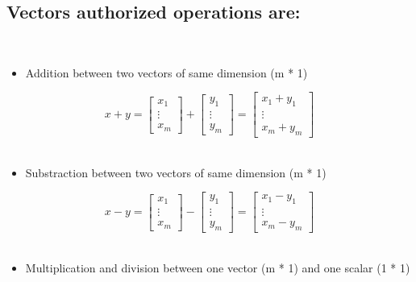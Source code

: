 \documentclass[]{article}
\providecommand{\tightlist}{%
  \setlength{\itemsep}{0pt}\setlength{\parskip}{0pt}}
\begin{document}
\hypertarget{vectors-authorized-operations-are}{%
\subsection{Vectors authorized operations
are:}\label{vectors-authorized-operations-are}}

​

\begin{itemize}
\tightlist
\item
  Addition between two vectors of same dimension (m * 1)
\end{itemize}

\large

\[
x + y = 
\begin{bmatrix} x_1 \\ \vdots \\ x_m\end{bmatrix} + 
\begin{bmatrix} y_1 \\ \vdots \\ y_m\end{bmatrix} 
= \begin{bmatrix} x_1 + y_1 \\ \vdots \\ x_m + y_m \end{bmatrix}
\] \normalsize ​

\begin{itemize}
\tightlist
\item
  Substraction between two vectors of same dimension (m * 1)
\end{itemize}

\large

\[
x - y = 
\begin{bmatrix} x_1 \\ \vdots \\ x_m\end{bmatrix} - 
\begin{bmatrix} y_1 \\ \vdots \\ y_m\end{bmatrix} 
= \begin{bmatrix} x_1 - y_1 \\ \vdots \\ x_m - y_m \end{bmatrix}
\] \normalsize ​

\begin{itemize}
\tightlist
\item
  Multiplication and division between one vector (m * 1) and one scalar
  (1 * 1)
\end{itemize}
\end{document}
